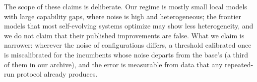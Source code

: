 The scope of these claims is deliberate. Our regime is mostly small local models with
large capability gaps, where noise is high and heterogeneous; the frontier models
that most self-evolving systems optimize may show less heterogeneity, and we do
not claim that their published improvements are false. What we claim is
narrower: wherever the noise of configurations differs, a threshold calibrated once is miscalibrated for the incumbents whose noise departs from the base's (a third of them in our archive), and the error is measurable from data that any repeated-run protocol already produces.
